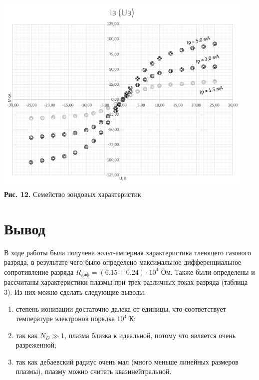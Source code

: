 \documentclass[a4paper,12pt]{article} %
\begin{document}
\begin{center}
\includegraphics[width=0.95\textwidth]{3.5.1_14.png}\\
\textbf{Рис. 12.} Семейство зондовых характеристик \\
\end{center}

\section{Вывод}
\hfill \break В ходе работы была получена вольт-амперная характеристика тлеющего газового разряда, в результате чего было определено максимальное дифференциальное сопротивление разряда $R_\text{диф} = (6.15 \pm 0.24) \cdot 10^4$ Ом. Также были определены и рассчитаны характеристики плазмы при трех различных токах разряда (таблица 3). Из них можно сделать следующие выводы:
\begin{enumerate}
\item{степень ионизации достаточно далека от единицы, что соответствует температуре электронов порядка $10^4$ К;}
\item{так как $N_{D} \gg 1$, плазма близка к идеальной, потому что является очень разреженной;}
\item{так как дебаевский радиус очень мал (много меньше линейных размеров плазмы), плазму можно считать квазинейтральной.}
\end{enumerate}
\end{document}
